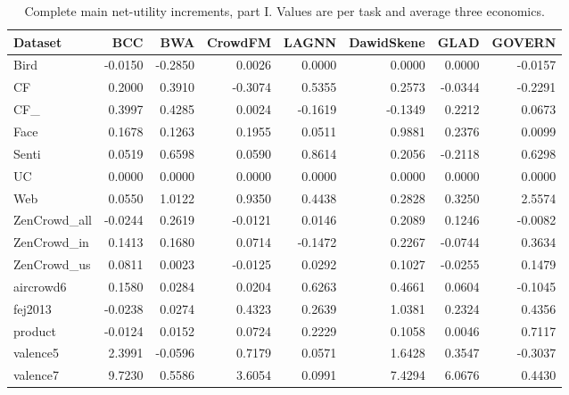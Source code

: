\documentclass[journal]{IEEEtran}
\newcommand{\smalltable}{\footnotesize\setlength{\tabcolsep}{3.5pt}}
\begin{document}
\begin{table}[t]
\caption{Complete main net-utility increments, part I. Values are per task and average three economics.}
\label{tab:complete1}\centering\smalltable
\begin{tabular}{lrrrrrrr}
\toprule
Dataset & BCC & BWA & CrowdFM & LAGNN & DawidSkene & GLAD & GOVERN \\
\midrule
Bird & -0.0150 & -0.2850 & 0.0026 & 0.0000 & 0.0000 & 0.0000 & -0.0157 \\
CF & 0.2000 & 0.3910 & -0.3074 & 0.5355 & 0.2573 & -0.0344 & -0.2291 \\
CF\_ & 0.3997 & 0.4285 & 0.0024 & -0.1619 & -0.1349 & 0.2212 & 0.0673 \\
Face & 0.1678 & 0.1263 & 0.1955 & 0.0511 & 0.9881 & 0.2376 & 0.0099 \\
Senti & 0.0519 & 0.6598 & 0.0590 & 0.8614 & 0.2056 & -0.2118 & 0.6298 \\
UC & 0.0000 & 0.0000 & 0.0000 & 0.0000 & 0.0000 & 0.0000 & 0.0000 \\
Web & 0.0550 & 1.0122 & 0.9350 & 0.4438 & 0.2828 & 0.3250 & 2.5574 \\
ZenCrowd\_all & -0.0244 & 0.2619 & -0.0121 & 0.0146 & 0.2089 & 0.1246 & -0.0082 \\
ZenCrowd\_in & 0.1413 & 0.1680 & 0.0714 & -0.1472 & 0.2267 & -0.0744 & 0.3634 \\
ZenCrowd\_us & 0.0811 & 0.0023 & -0.0125 & 0.0292 & 0.1027 & -0.0255 & 0.1479 \\
aircrowd6 & 0.1580 & 0.0284 & 0.0204 & 0.6263 & 0.4661 & 0.0604 & -0.1045 \\
fej2013 & -0.0238 & 0.0274 & 0.4323 & 0.2639 & 1.0381 & 0.2324 & 0.4356 \\
product & -0.0124 & 0.0152 & 0.0724 & 0.2229 & 0.1058 & 0.0046 & 0.7117 \\
valence5 & 2.3991 & -0.0596 & 0.7179 & 0.0571 & 1.6428 & 0.3547 & -0.3037 \\
valence7 & 9.7230 & 0.5586 & 3.6054 & 0.0991 & 7.4294 & 6.0676 & 0.4430 \\
\bottomrule
\end{tabular}

\end{table}
\end{document}
